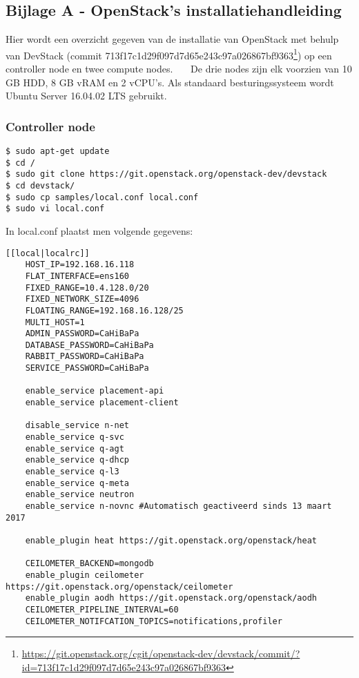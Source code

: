 \begin{appendices}
\section*{Bijlage A - OpenStack's installatiehandleiding}
\label{att:installation}

Hier wordt een overzicht gegeven van de installatie van OpenStack met behulp van DevStack (commit 	713f17c1d29f097d7d65e243c97a026867bf9363\footnote{\url{https://git.openstack.org/cgit/openstack-dev/devstack/commit/?id=713f17c1d29f097d7d65e243c97a026867bf9363}}) op een controller node en twee compute nodes.~\cite{DevStack2017}~\cite{DevStack2017a}~\cite{AskUbuntu2011} De drie nodes zijn elk voorzien van 10 GB HDD, 8 GB vRAM en 2 vCPU's. Als standaard besturingssysteem wordt Ubuntu Server 16.04.02 LTS gebruikt.

\subsubsection{Controller node}

\begin{code}
\begin{verbatim}
$ sudo apt-get update
$ cd /
$ sudo git clone https://git.openstack.org/openstack-dev/devstack
$ cd devstack/
$ sudo cp samples/local.conf local.conf
$ sudo vi local.conf
\end{verbatim}
\end{code}

In local.conf plaatst men volgende gegevens:

\begin{code}
\begin{verbatim}
[[local|localrc]]
	HOST_IP=192.168.16.118
	FLAT_INTERFACE=ens160
	FIXED_RANGE=10.4.128.0/20
	FIXED_NETWORK_SIZE=4096
	FLOATING_RANGE=192.168.16.128/25
	MULTI_HOST=1
	ADMIN_PASSWORD=CaHiBaPa
	DATABASE_PASSWORD=CaHiBaPa
	RABBIT_PASSWORD=CaHiBaPa
	SERVICE_PASSWORD=CaHiBaPa

	enable_service placement-api
	enable_service placement-client

	disable_service n-net
	enable_service q-svc
	enable_service q-agt
	enable_service q-dhcp
	enable_service q-l3
	enable_service q-meta
	enable_service neutron
	enable_service n-novnc #Automatisch geactiveerd sinds 13 maart 2017

	enable_plugin heat https://git.openstack.org/openstack/heat

	CEILOMETER_BACKEND=mongodb
	enable_plugin ceilometer https://git.openstack.org/openstack/ceilometer
	enable_plugin aodh https://git.openstack.org/openstack/aodh
	CEILOMETER_PIPELINE_INTERVAL=60
	CEILOMETER_NOTIFCATION_TOPICS=notifications,profiler
\end{verbatim}
\end{code}


\end{appendices}
